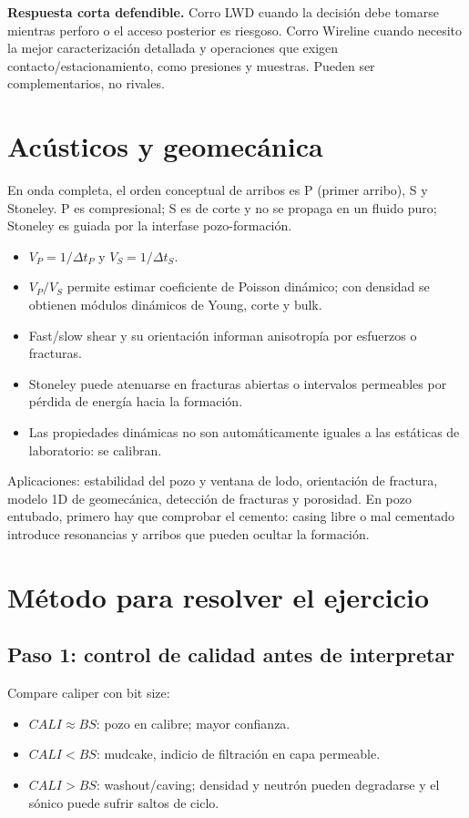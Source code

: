 \documentclass[10.5pt,a4paper]{article}
\newcommand{\oral}[1]{\par\textcolor{petro}{\textbf{Respuesta corta defendible.} #1}\par}
\begin{document}
\oral{Corro LWD cuando la decisi\'on debe tomarse mientras perforo o el acceso posterior es riesgoso. Corro Wireline cuando necesito la mejor caracterizaci\'on detallada y operaciones que exigen contacto/estacionamiento, como presiones y muestras. Pueden ser complementarios, no rivales.}

\section{Ac\'usticos y geomec\'anica}

En onda completa, el orden conceptual de arribos es P (primer arribo), S y Stoneley. P es compresional; S es de corte y no se propaga en un fluido puro; Stoneley es guiada por la interfase pozo-formaci\'on.

\begin{itemize}
  \item $V_P=1/\Delta t_P$ y $V_S=1/\Delta t_S$.
  \item $V_P/V_S$ permite estimar coeficiente de Poisson din\'amico; con densidad se obtienen m\'odulos din\'amicos de Young, corte y bulk.
  \item Fast/slow shear y su orientaci\'on informan anisotrop\'ia por esfuerzos o fracturas.
  \item Stoneley puede atenuarse en fracturas abiertas o intervalos permeables por p\'erdida de energ\'ia hacia la formaci\'on.
  \item Las propiedades din\'amicas no son autom\'aticamente iguales a las est\'aticas de laboratorio: se calibran.
\end{itemize}

Aplicaciones: estabilidad del pozo y ventana de lodo, orientaci\'on de fractura, modelo 1D de geomec\'anica, detecci\'on de fracturas y porosidad. En pozo entubado, primero hay que comprobar el cemento: casing libre o mal cementado introduce resonancias y arribos que pueden ocultar la formaci\'on.

\section{M\'etodo para resolver el ejercicio}

\subsection{Paso 1: control de calidad antes de interpretar}

Compare caliper con bit size:
\begin{itemize}
  \item $CALI\approx BS$: pozo en calibre; mayor confianza.
  \item $CALI<BS$: mudcake, indicio de filtraci\'on en capa permeable.
  \item $CALI>BS$: washout/caving; densidad y neutr\'on pueden degradarse y el s\'onico puede sufrir saltos de ciclo.
\end{itemize}
\end{document}
